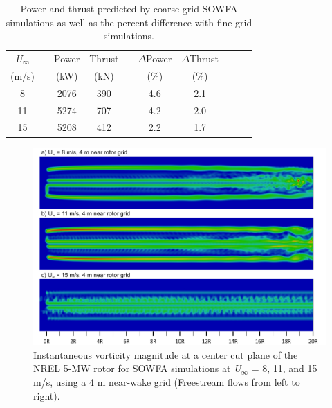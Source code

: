 \begin{table}
\centering
\begin{tabular}{c c c c c c c c c c}
\hline
 \emph{U$_{\infty}$}   & & {Power} &  {Thrust} & &  $\Delta$Power & $\Delta$Thrust\\
 (m/s) & & {(kW)} & {(kN)} & & {(\%)}  & {(\%)} \\
\hline
8   & & 2076 & 390 & & 4.6 & 2.1 \\
11 & & 5274 & 707 & & 4.2 & 2.0 \\
15 & & 5208 & 412 & & 2.2 & 1.7 \\
\hline
\end{tabular}
\caption{ Power and thrust predicted by coarse grid SOWFA simulations as well as the percent difference with fine grid simulations.}
\label{Table5}
\end{table}

\begin{figure}[htbp]
\centering
 \includegraphics[width=.85\textwidth]{Figures/ch5Figures/VortSlice_Resolution}
 \caption{ Instantaneous vorticity magnitude at a center cut plane of the NREL 5-MW rotor  for SOWFA simulations at \emph{U$_\infty$} = 8, 11, and 15 m/s, using a 4 m near-wake grid (Freestream flows from left to right). }
 \label{vortMag_resolution}
\end{figure}   


